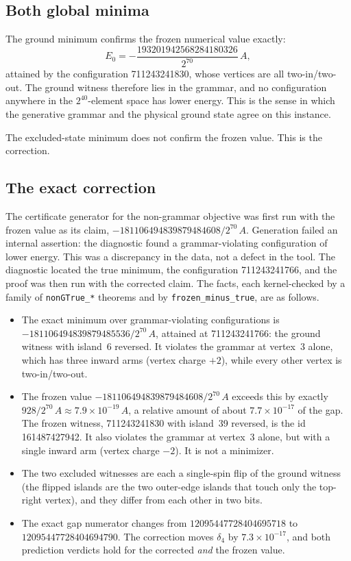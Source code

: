 \documentclass[11pt,a4paper]{article}
\theoremstyle{plain}
\theoremstyle{definition}
\theoremstyle{remark}
\newcommand{\lean}[1]{\nolinkurl{#1}}
\begin{document}
\subsection{Both global minima}
The ground minimum confirms the frozen numerical value exactly:
\[
E_0=-\frac{193201942568284180326}{2^{70}}\,A,
\]
attained by the configuration 711243241830, whose vertices are all two-in/two-out. The ground witness therefore lies in the grammar, and no configuration anywhere in the $2^{40}$-element space has lower energy. This is the sense in which the generative grammar and the physical ground state agree on this instance.

The excluded-state minimum does not confirm the frozen value. This is the correction.

\subsection{The exact correction}
The certificate generator for the non-grammar objective was first run with the frozen value as its claim, $-181106494839879484608/2^{70}\,A$. Generation failed an internal assertion: the diagnostic found a grammar-violating configuration of lower energy. This was a discrepancy in the data, not a defect in the tool. The diagnostic located the true minimum, the configuration 711243241766, and the proof was then run with the corrected claim. The facts, each kernel-checked by a family of \lean{nonGTrue_*} theorems and by \lean{frozen_minus_true}, are as follows.
\begin{itemize}
\item The exact minimum over grammar-violating configurations is $-181106494839879485536/2^{70}\,A$, attained at 711243241766: the ground witness with island~6 reversed. It violates the grammar at vertex~3 alone, which has three inward arms (vertex charge $+2$), while every other vertex is two-in/two-out.
\item The frozen value $-181106494839879484608/2^{70}\,A$ exceeds this by exactly $928/2^{70}\,A\approx7.9\times10^{-19}\,A$, a relative amount of about $7.7\times10^{-17}$ of the gap. The frozen witness, 711243241830 with island~39 reversed, is the id 161487427942. It also violates the grammar at vertex~3 alone, but with a single inward arm (vertex charge $-2$). It is not a minimizer.
\item The two excluded witnesses are each a single-spin flip of the ground witness (the flipped islands are the two outer-edge islands that touch only the top-right vertex), and they differ from each other in two bits.
\item The exact gap numerator changes from $12095447728404695718$ to $12095447728404694790$. The correction moves $\delta_4$ by $7.3\times10^{-17}$, and both prediction verdicts hold for the corrected \emph{and} the frozen value.
\end{itemize}
\end{document}
